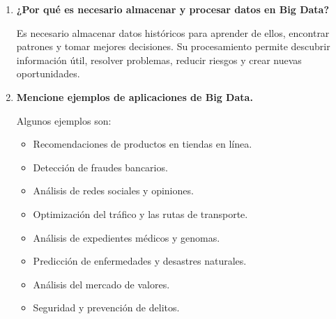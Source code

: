 \begin{enumerate}
\begin{itemize}
    \item 6.3 millones de búsquedas en Google.
    \item 41.6 millones de mensajes enviados por WhatsApp.
    \item 241 millones de correos electrónicos enviados.
    \item 360\,000 publicaciones realizadas en X.
    \item 694\,000 reels enviados por mensaje directo en Instagram.
    \item 4 millones de publicaciones recibieron ``Me gusta'' en Facebook.
    \item 6\,944 solicitudes fueron enviadas a ChatGPT.
    \item Se consumieron 43 años de contenido en servicios de transmisión.
    \item Se reprodujeron 24\,000 horas de música en Spotify.
    \item Se realizaron más de \$455\,000 en compras en Amazon.
    \item Se enviaron \$463\,768 mediante Venmo.
    \item Se realizaron \$122\,785 en pedidos de DoorDash.
    \item Se produjeron 30 ataques de denegación de servicio distribuido (DDoS).
\end{itemize}

\item \textbf{¿Por qué es necesario almacenar y procesar datos en Big Data?}

Es necesario almacenar datos históricos para aprender de ellos, encontrar patrones y tomar mejores decisiones. Su procesamiento permite descubrir información útil, resolver problemas, reducir riesgos y crear nuevas oportunidades.

\item \textbf{Mencione ejemplos de aplicaciones de Big Data.}

Algunos ejemplos son:

\begin{itemize}
    \item Recomendaciones de productos en tiendas en línea.
    \item Detección de fraudes bancarios.
    \item Análisis de redes sociales y opiniones.
    \item Optimización del tráfico y las rutas de transporte.
    \item Análisis de expedientes médicos y genomas.
    \item Predicción de enfermedades y desastres naturales.
    \item Análisis del mercado de valores.
    \item Seguridad y prevención de delitos.
\end{itemize}


\end{enumerate}

